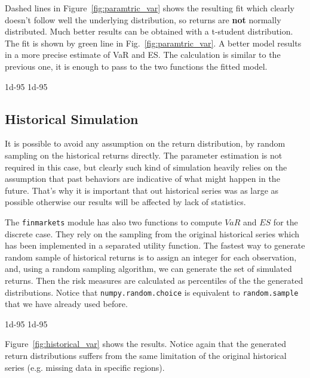 Dashed lines in Figure~\ref{fig:paramtric_var} shows the resulting fit which clearly doesn't follow well the underlying distribution, so returns are \textbf{not} normally distributed. Much better results can be obtained with a t-student distribution. The fit is shown by green line in Fig.~\ref{fig:paramtric_var}. A better model results in a more precise estimate of VaR and ES. The calculation is similar to the previous one, it is enough to pass to the two functions the fitted model.

\begin{ioutput}
1d-95%
1d-95%
\end{ioutput}

\subsection{Historical Simulation}
\label{historical-simulation}

It is possible to avoid any assumption on the return distribution, by random sampling on the historical returns directly. The parameter estimation is not required in this case, but clearly such kind of simulation heavily relies on the assumption that past behaviors are indicative of what might happen in the future. That's why it is important that out historical series was as large as possible otherwise our results will be affected by lack of statistics. 

\begin{finmarkets}
The \texttt{finmarkets} module has also two functions to compute $VaR$ and $ES$ for the discrete case. 
They rely on the sampling from the original historical series which has been implemented in a separated utility function. The fastest way to generate random sample of historical returns is to assign an integer for each observation, and, using a random sampling algorithm, we can generate the set of simulated returns. Then the risk measures are calculated as percentiles of the the generated distributions. Notice that \texttt{numpy.random.choice} is equivalent to \texttt{random.sample} that we have already used before.
\end{finmarkets}

\begin{ioutput}
1d-95%
1d-95%
\end{ioutput}

Figure~\ref{fig:historical_var} shows the results. Notice again that the generated return distributions suffers from the same limitation of the original historical series (e.g. missing data in specific regions).

